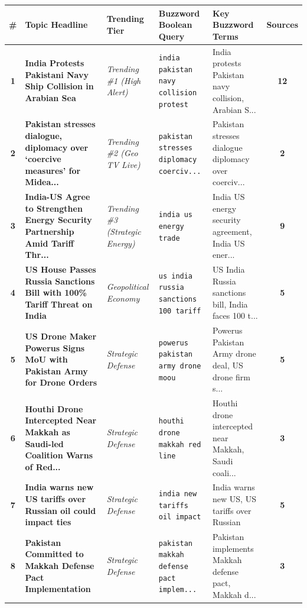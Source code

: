 \documentclass[8.5pt,a4paper]{article}
\begin{document}
{\fontsize{7.2pt}{8.2pt}\selectfont
\renewcommand{\arraystretch}{0.92}
\begin{tabularx}{\textwidth}{@{} c p{5.4cm} p{2.2cm} p{4.3cm} p{4.3cm} c @{}}
\toprule
\rowcolor{tableheader}
\textbf{\#} & \textbf{Topic Headline} & \textbf{Trending Tier} & \textbf{Buzzword Boolean Query} & \textbf{Key Buzzword Terms} & \textbf{Sources} \\
\midrule

\rowcolor{rowlight}
\textbf{1} & \textbf{India Protests Pakistani Navy Ship Collision in Arabian Sea} & \textit{Trending \#1 (High Alert)} & \texttt{india pakistan navy collision protest} & India protests Pakistan navy collision, Arabian S... & \textbf{12} \\
\rowcolor{rowdark}
\textbf{2} & \textbf{Pakistan stresses dialogue, diplomacy over ‘coercive measures' for Midea...} & \textit{Trending \#2 (Geo TV Live)} & \texttt{pakistan stresses diplomacy coerciv...} & Pakistan stresses dialogue diplomacy over coerciv... & \textbf{2} \\
\rowcolor{rowlight}
\textbf{3} & \textbf{India-US Agree to Strengthen Energy Security Partnership Amid Tariff Thr...} & \textit{Trending \#3 (Strategic Energy)} & \texttt{india us energy trade} & India US energy security agreement, India US ener... & \textbf{9} \\
\rowcolor{rowdark}
\textbf{4} & \textbf{US House Passes Russia Sanctions Bill with 100\% Tariff Threat on India} & \textit{Geopolitical Economy} & \texttt{us india russia sanctions 100 tariff} & US India Russia sanctions bill, India faces 100 t... & \textbf{5} \\
\rowcolor{rowlight}
\textbf{5} & \textbf{US Drone Maker Powerus Signs MoU with Pakistan Army for Drone Orders} & \textit{Strategic Defense} & \texttt{powerus pakistan army drone moou} & Powerus Pakistan Army drone deal, US drone firm s... & \textbf{5} \\
\rowcolor{rowdark}
\textbf{6} & \textbf{Houthi Drone Intercepted Near Makkah as Saudi-led Coalition Warns of Red...} & \textit{Strategic Defense} & \texttt{houthi drone makkah red line} & Houthi drone intercepted near Makkah, Saudi coali... & \textbf{3} \\
\rowcolor{rowlight}
\textbf{7} & \textbf{India warns new US tariffs over Russian oil could impact ties} & \textit{Strategic Defense} & \texttt{india new tariffs oil impact} & India warns new US, US tariffs over Russian & \textbf{5} \\
\rowcolor{rowdark}
\textbf{8} & \textbf{Pakistan Committed to Makkah Defense Pact Implementation} & \textit{Strategic Defense} & \texttt{pakistan makkah defense pact implem...} & Pakistan implements Makkah defense pact, Makkah d... & \textbf{3} \\

\end{tabularx}}
\end{document}
